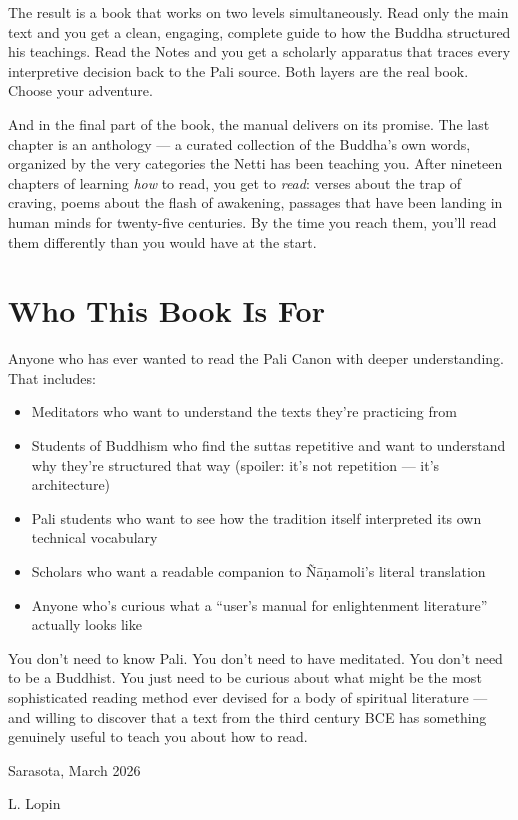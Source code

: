 The result is a book that works on two levels simultaneously. Read only the main text and you get a clean, engaging, complete guide to how the Buddha structured his teachings. Read the Notes and you get a scholarly apparatus that traces every interpretive decision back to the Pali source. Both layers are the real book. Choose your adventure.

And in the final part of the book, the manual delivers on its promise. The last chapter is an anthology --- a curated collection of the Buddha's own words, organized by the very categories the Netti has been teaching you. After nineteen chapters of learning \textit{how} to read, you get to \textit{read}: verses about the trap of craving, poems about the flash of awakening, passages that have been landing in human minds for twenty-five centuries. By the time you reach them, you'll read them differently than you would have at the start.

\section*{Who This Book Is For}

Anyone who has ever wanted to read the Pali Canon with deeper understanding. That includes:

\begin{itemize}[nosep]
\item Meditators who want to understand the texts they're practicing from
\item Students of Buddhism who find the suttas repetitive and want to understand why they're structured that way (spoiler: it's not repetition --- it's architecture)
\item Pali students who want to see how the tradition itself interpreted its own technical vocabulary
\item Scholars who want a readable companion to Ñāṇamoli's literal translation
\item Anyone who's curious what a ``user's manual for enlightenment literature'' actually looks like
\end{itemize}

You don't need to know Pali. You don't need to have meditated. You don't need to be a Buddhist. You just need to be curious about what might be the most sophisticated reading method ever devised for a body of spiritual literature --- and willing to discover that a text from the third century BCE has something genuinely useful to teach you about how to read.

\vspace{2\baselineskip}
\hfill Sarasota, March 2026

\hfill L. Lopin

\cleardoublepage
